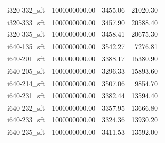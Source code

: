 \begin{tabular}{lrrr}
i320-332\_sft & 1000000000.00 &           3455.06 &    21020.30 \\
i320-333\_sft & 1000000000.00 &           3457.90 &    20588.40 \\
i320-335\_sft & 1000000000.00 &           3458.41 &    20675.30 \\
i640-135\_sft & 1000000000.00 &           3542.27 &     7276.81 \\
i640-201\_sft & 1000000000.00 &           3388.17 &    15380.90 \\
i640-205\_sft & 1000000000.00 &           3296.33 &    15893.60 \\
i640-214\_sft & 1000000000.00 &           3507.06 &     9854.70 \\
i640-231\_sft & 1000000000.00 &           3382.44 &    13594.40 \\
i640-232\_sft & 1000000000.00 &           3357.95 &    13666.80 \\
i640-233\_sft & 1000000000.00 &           3324.36 &    13930.20 \\
i640-235\_sft & 1000000000.00 &           3411.53 &    13592.00 \\
\bottomrule
\end{tabular}
